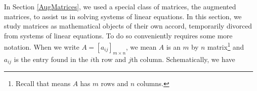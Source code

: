 

\setcounter{footnote}{0}

\label{MatArithmetic}

\setlength{\extrarowheight}{0pt}

In Section \ref{AugMatrices}, we used a special class of matrices, the augmented matrices, to assist us in solving systems of linear equations.  In this section, we study matrices as mathematical objects of their own accord, temporarily divorced from systems of linear equations.  To do so conveniently requires some more notation.  When we write $A = \left[ a_{ij}  \right]_{m \times n}$, we mean $A$ is an $m$ by $n$ matrix\footnote{Recall that means $A$ has $m$ rows and $n$ columns.} and $a_{ij}$ is the entry found in the $i$th row and $j$th column.  Schematically, we have





